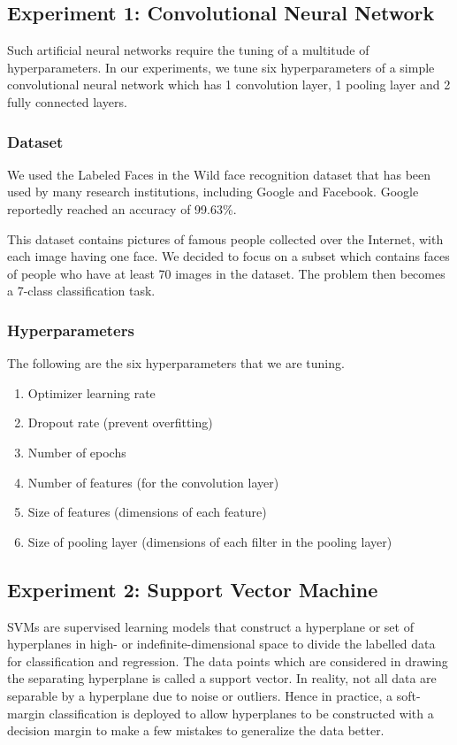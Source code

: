 \documentclass[letterpaper]{article}
\begin{document}
\subsection{Experiment 1: Convolutional Neural Network}
Such artificial neural networks require the tuning of a multitude of hyperparameters.
In our experiments, we tune six hyperparameters of a simple convolutional neural 
network which has 1 convolution layer, 1 pooling layer and 2 fully connected layers.

\subsubsection{Dataset}
We used the Labeled Faces in the Wild face recognition dataset that has been used
by many research institutions, including Google and Facebook. Google reportedly 
reached an accuracy of 99.63\%.

This dataset contains pictures of famous people collected over the Internet, with 
each image having one face. We decided to focus on a subset which contains faces 
of people who have at least 70 images in the dataset. The problem then becomes 
a 7-class classification task.

\subsubsection{Hyperparameters}
The following are the six hyperparameters that we are tuning.

\begin{enumerate}

    \item Optimizer learning rate
    \item Dropout rate (prevent overfitting)
    \item Number of epochs
    \item Number of features (for the convolution layer)
    \item Size of features (dimensions of each feature)
    \item Size of pooling layer (dimensions of each filter in the pooling layer)

\end{enumerate}

\subsection{Experiment 2: Support Vector Machine}
SVMs are supervised learning models that construct a hyperplane or set of hyperplanes in high-
or indefinite-dimensional space to divide the labelled data for classification and regression.
The data points which are considered in drawing the separating hyperplane is called a support
vector. In reality, not all data are separable by a hyperplane due to noise or outliers. Hence in
practice, a soft-margin classification is deployed to allow hyperplanes to be constructed
with a decision margin to make a few mistakes to generalize the data better.
\end{document}
